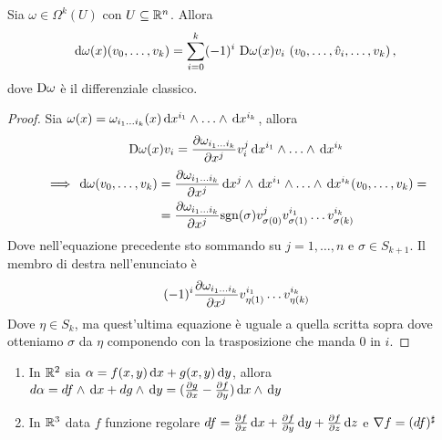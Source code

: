 \begin{corollary}
	Sia $\omega \in \Omega^k(U)$ con $U\subseteq \mathbb R^n$. Allora
	\begin{equation*}
		\,\mathrm d \omega (x) (v_0,\ldots,v_k) = \sum_{i=0}^k (-1)^i\ \mathrm D \omega (x) v_i\ (v_0,\ldots,\hat v_i, \ldots, v_k)\, \text{, }
	\end{equation*}
	dove $\mathrm D \omega$ è il differenziale classico.
\end{corollary}
\begin{proof}
	Sia $\omega(x) = \omega_{i_1 \ldots  i_{k}} (x) \,\mathrm d x^{i_1}\wedge\ldots\wedge \,\mathrm d x^{i_k}$, allora
	\begin{equation*}
		\mathrm D \omega(x) v_i = \frac{\partial \omega_{i_1 \ldots  i_{k}}}{\partial x^j} v_i^j \,\mathrm d x^{i_1}\wedge\ldots\wedge \,\mathrm d x^{i_k}
	\end{equation*}
	\begin{align*}
		\implies \,\mathrm d \omega (v_0,\ldots,v_k) &= \frac{\partial \omega_{i_1 \ldots  i_{k}}}{\partial x^j} \,\mathrm d x^j \wedge \,\mathrm d x^{i_1}\wedge\ldots\wedge \,\mathrm d x^{i_k} (v_0,\ldots,v_k)= \\
		&=\frac{\partial \omega_{i_1 \ldots  i_{k}}}{\partial x^j} \mathrm{sgn}(\sigma) v_{\sigma(0)}^{j} v_{\sigma(1)}^{i_1} \ldots v_{\sigma(k)}^{i_k}
	\end{align*}
	Dove nell'equazione precedente sto sommando su $j=1, \ldots,n$ e $\sigma \in S_{k+1}$.
	Il membro di destra nell'enunciato è
	\begin{equation*}
		(-1)^i \frac{\partial \omega_{i_1 \ldots  i_{k}}}{\partial x^j} v_{\eta(1)}^{i_1} \ldots v_{\eta(k)}^{i_k}
	\end{equation*}
	Dove $\eta \in S_k$, ma quest'ultima equazione è uguale a quella scritta sopra dove otteniamo
	$\sigma$ da $\eta$ componendo con la trasposizione che manda $0$ in $i$.
\end{proof}

\begin{example}
	\begin{enumerate}
	 \item In $\mathbb R^2$ sia $\alpha = f(x,y) \,\mathrm d x + g(x,y) \,\mathrm d y$, allora $d \alpha= d f\wedge \,\mathrm d x + d g \wedge \,\mathrm d y = (\frac{\partial g}{\partial x} - \frac{\partial f}{\partial y}) \,\mathrm d x\wedge \,\mathrm d y $
	 \item In $\mathbb R^3$ data $f$ funzione regolare $d f = \frac{\partial f}{\partial x} \,\mathrm d x + \frac{\partial f}{\partial y} \,\mathrm d y + \frac{\partial f}{\partial z} \,\mathrm d z$ e $\nabla f = (df)^\sharp$
	\end{enumerate}
\end{example}

